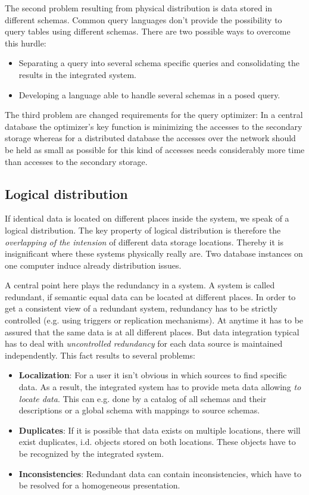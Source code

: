 The second problem resulting from physical distribution is data stored in different schemas. Common query languages don't provide the possibility to query tables using different schemas. There are two possible ways to overcome this hurdle:
\begin{itemize}
\item Separating a query into several schema specific queries and consolidating the results in the integrated system.
\item Developing a language able to handle several schemas in a posed query.
\end{itemize}

The third problem are changed requirements for the query optimizer: In a central database the optimizer's key function is minimizing  the accesses to the secondary storage whereas for a distributed database the accesses over the network should be held as small as possible for this kind of accesses needs considerably more time than accesses to the secondary storage.  

\subsection{Logical distribution}
If identical data is located on different places inside the system, we speak of a logical distribution. The key property of logical distribution is therefore the \textit{overlapping of the intension} of different data storage locations. Thereby it is insignificant where these systems physically really are. Two database instances on one computer induce already distribution issues.

A central point here plays the redundancy in a system. A system is called redundant, if semantic equal data can be located at different places. In order to get a consistent view of a redundant system, redundancy has to be strictly controlled (e.g. using triggers or replication mechanisms). At anytime it has to be assured that the same data is at all different places. But data integration typical has to deal with \textit{uncontrolled redundancy} for each data source is maintained independently. This fact results to several problems:
\begin{itemize}
\item \textbf{Localization}: For a user it isn't obvious in which sources to find specific data. As a result, the integrated system has to provide meta data allowing \textit{to locate data}. This can e.g. done by a catalog of all schemas and their descriptions or a global schema with mappings to source schemas.
\item \textbf{Duplicates}: If it is possible that data exists on multiple locations, there will exist duplicates, i.d. objects stored on both locations. These objects have to be recognized by the integrated system.
\item \textbf{Inconsistencies}: Redundant data can contain inconsistencies, which have to be resolved for a homogeneous presentation.
\end{itemize}

